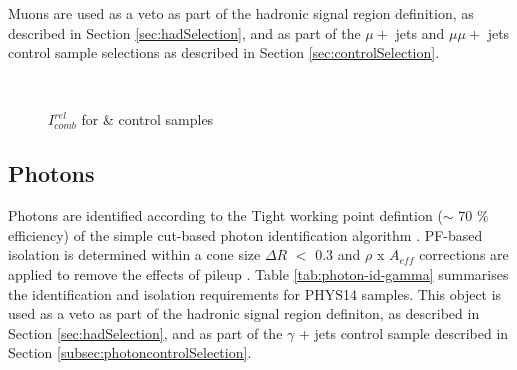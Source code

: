 Muons are used as a veto as part of the hadronic signal region definition, as described in Section \ref{sec:hadSelection}, and as part of the $\mu +$ jets and $\mu\mu +$ jets control sample selections as described in Section \ref{sec:controlSelection}.

\begin{figure}[h]
  \centering
  ~~
  ~~  
\caption{$I_{comb}^{rel}$ for \texorpdfstring{\mj}{muon plus jets} & \texorpdfstring{\mmj}{di-muon plus jets} control samples}
\end{figure}


\subsection{Photons}
\label{sec:photon-id}
Photons are identified according to the Tight working point defintion ($\sim$ 70 $\%$ efficiency) of the simple cut-based photon identification algorithm \cite{photon-id}. PF-based isolation is determined within a cone size $\Delta R$ $<$ 0.3 and $\rho$ x $A_{eff}$ corrections are applied to remove the effects of pileup \cite{pf-photon}. Table \ref{tab:photon-id-gamma} summarises the identification and isolation requirements for PHYS14 samples. 
This object is used as a veto as part of the hadronic signal region definiton, as described in Section \ref{sec:hadSelection}, and as part of the $\gamma$ + jets control sample described in Section \ref{subsec:photoncontrolSelection}.

